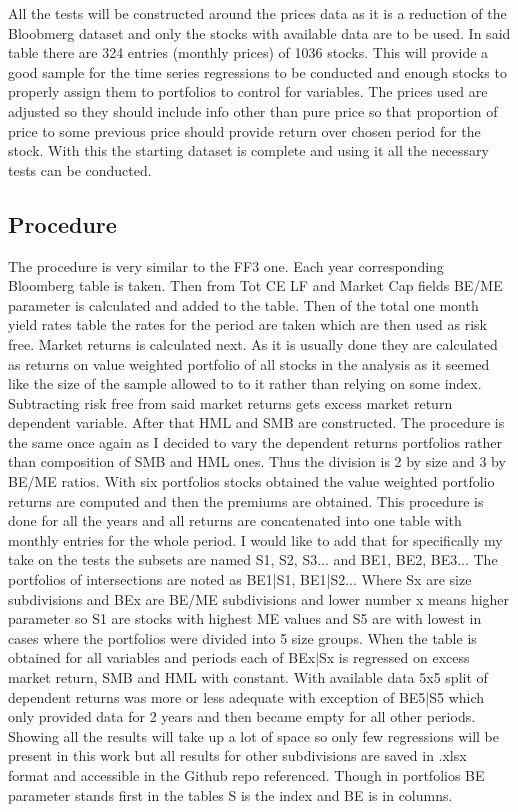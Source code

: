 \documentclass[a4paper,12pt]{article} %
\begin{document}
	All the tests will be constructed around the prices data as it is a reduction of the Bloobmerg dataset and only the stocks with available data are to be used. In said table there are 324 entries (monthly prices) of 1036 stocks. This will provide a good sample for the time series regressions to be conducted and enough stocks to properly assign them to portfolios to control for variables. The prices used are adjusted so they should include info other than pure price so that proportion of price to some previous price should provide return over chosen period for the stock. With this the starting dataset is complete and using it all the necessary tests can be conducted.
	\subsection{Procedure}
	The procedure is very similar to the FF3 one. Each year corresponding Bloomberg table is taken. Then from Tot CE LF and Market Cap fields BE/ME parameter is calculated and added to the table. Then of the total one month yield rates table the rates for the period are taken which are then used as risk free. Market returns is calculated next. As it is usually done they are calculated as returns on value weighted portfolio of all stocks in the analysis as it seemed like the size of the sample allowed to to it rather than relying on some index. Subtracting risk free from said market returns gets excess market return dependent variable. After that HML and SMB are constructed. The procedure is the same once again as I decided to vary the dependent returns portfolios rather than composition of SMB and HML ones. Thus the division is 2 by size and 3 by BE/ME ratios. With six portfolios stocks obtained the value weighted portfolio returns are computed and then the premiums are obtained. This procedure is done for all the years and all returns are concatenated into one table with monthly entries for the whole period. I would like to add that for specifically my take on the tests the subsets are named S1, S2, S3... and BE1, BE2, BE3... The portfolios of intersections are noted as BE1|S1, BE1|S2... Where Sx are size subdivisions and BEx are BE/ME subdivisions and lower number x means higher parameter so S1 are stocks with highest ME values and S5 are with lowest in cases where the portfolios were divided into 5 size groups.
	When the table is obtained for all variables and periods each of BEx|Sx is regressed on excess market return, SMB and HML with constant. With available data 5x5 split of dependent returns was more or less adequate with exception of BE5|S5 which only provided data for 2 years and then became empty for all other periods. Showing all the results will take up a lot of space so only few regressions will be present in this work but all results for other subdivisions are saved in .xlsx format and accessible in the Github repo referenced. Though in portfolios BE parameter stands first in the tables S is the index and BE is in columns.
\end{document}
